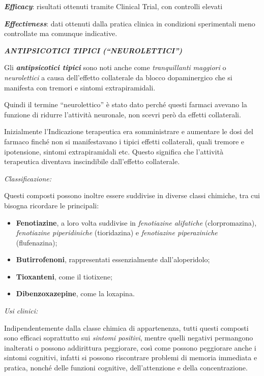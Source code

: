 \documentclass[]{article}
\begin{document}
\emph{\textbf{Efficacy}}: risultati ottenuti tramite Clinical Trial, con
controlli elevati

\emph{\textbf{Effectivness}}: dati ottenuti dalla pratica clinica in
condizioni sperimentali meno controllate ma comunque indicative.

\textbf{\emph{ANTIPSICOTICI TIPICI (``NEUROLETTICI'')}}

Gli \textbf{\emph{antipsicotici tipici}} sono noti anche come
\emph{tranquillanti maggiori} o \emph{neurolettici} a causa dell'effetto
collaterale da blocco dopaminergico che si manifesta con tremori e
sintomi extrapiramidali.

Quindi il termine ``neurolettico'' è stato dato perché questi farmaci
avevano la funzione di ridurre l'attività neuronale, non scevri però da
effetti collaterali.

Inizialmente l'Indicazione terapeutica era somministrare e aumentare le
dosi del farmaco finché non si manifestavano i tipici effetti
collaterali, quali tremore e ipotensione, sintomi extrapiramidali etc.
Questo significa che l'attività terapeutica diventava inscindibile
dall'effetto collaterale.

\emph{\emph{Classificazione:}}

Questi composti possono inoltre essere suddivise in diverse classi
chimiche, tra cui bisogna ricordare le principali:

\begin{itemize}
\item
  \textbf{Fenotiazine}, a loro volta suddivise in \emph{fenotiazine
  alifatiche} (clorpromazina), \emph{fenotiazine piperidiniche}
  (tioridazina) e \emph{fenotiazine piperaziniche} (flufenazina);
\item
  \textbf{Butirrofenoni}, rappresentati essenzialmente dall'aloperidolo;
\item
  \textbf{Tioxanteni}, come il tiotixene;
\item
  \textbf{Dibenzoxazepine}, come la loxapina.
\end{itemize}

\emph{\emph{Usi clinici:}}

Indipendentemente dalla classe chimica di appartenenza, tutti questi
composti sono efficaci soprattutto sui \emph{sintomi positivi}, mentre
quelli negativi permangono inalterati o possono addirittura peggiorare,
così come possono peggiorare anche i sintomi cognitivi, infatti si
possono riscontrare problemi di memoria immediata e pratica, nonché
delle funzioni cognitive, dell'attenzione e della concentrazione.
\end{document}
